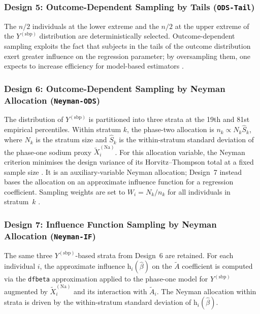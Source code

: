 \subsubsection{Design 5: Outcome-Dependent Sampling by Tails (\texttt{ODS-Tail})}

The $n/2$ individuals at the lower extreme and the $n/2$ at the upper extreme of the $Y^{(\mathrm{sbp})}$ distribution are deterministically selected. Outcome-dependent sampling exploits the fact that subjects in the tails of the outcome distribution exert greater influence on the regression parameter; by oversampling them, one expects to increase efficiency for model-based estimators \citep{zhou2002semiparametric, amorim2021two}.

\subsubsection{Design 6: Outcome-Dependent Sampling by Neyman Allocation (\texttt{Neyman-ODS})}

The distribution of $Y^{(\mathrm{sbp})}$ is partitioned into three strata at the 19th and 81st empirical percentiles. Within stratum $k$, the phase-two allocation is $n_k \propto N_k \hat{S}_k$, where $N_k$ is the stratum size and $\hat{S}_k$ is the within-stratum standard deviation of the phase-one sodium proxy $\tilde{X}_i^{(\mathrm{Na})}$. For this allocation variable, the Neyman criterion minimises the design variance of its Horvitz--Thompson total at a fixed sample size \citep{neyman1938contribution}. It is an auxiliary-variable Neyman allocation; Design~7 instead bases the allocation on an approximate influence function for a regression coefficient. Sampling weights are set to $W_i = N_k / n_k$ for all individuals in stratum~$k$ \citep{Weaver2005, lumley2011connections}.

\subsubsection{Design 7: Influence Function Sampling by Neyman Allocation (\texttt{Neyman-IF})}

The same three $Y^{(\mathrm{sbp})}$-based strata from Design~6 are retained. For each individual $i$, the approximate influence $\mathrm{h}_i(\hat{\beta})$ on the $\tilde{A}$ coefficient is computed via the \texttt{dfbeta} approximation applied to the phase-one model for $Y^{(\mathrm{sbp})}$ augmented by $\tilde{X}_i^{(\mathrm{Na})}$ and its interaction with $\tilde{A}_i$. The Neyman allocation within strata is driven by the within-stratum standard deviation of $\mathrm{h}_i(\hat{\beta})$.

